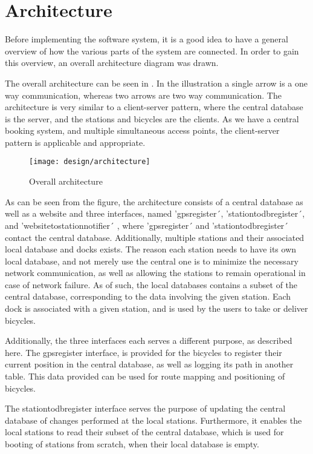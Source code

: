\section{Architecture}
Before implementing the software system, it is a good idea to have a general overview of how the various parts of the system are connected.
In order to gain this overview, an overall architecture diagram was drawn.

The overall architecture can be seen in .
In the illustration a single arrow is a one way communication, whereas two arrows are two way communication.
The architecture is very similar to a client-server pattern, where the central database is the server, and the stations and bicycles are the clients.
As we have a central booking system, and multiple simultaneous access points, the client-server pattern is applicable and appropriate.

\begin{figure}[h]
	\centering
	\texttt{[image: design/architecture]}
	\caption{Overall architecture}\label{fig:overallarch}
\end{figure}

As can be seen from the figure, the architecture consists of a central database as well as a website and three interfaces, named 'gpsregister´, 'stationtodbregister´, and 'websitetostationnotifier´ , where 'gpsregister´ and 'stationtodbregister´ contact the central database.
Additionally, multiple stations and their associated local database and docks exists.
The reason each station needs to have its own local database, and not merely use the central one is to minimize the necessary network communication, as well as allowing the stations to remain operational in case of network failure.
As of such, the local databases contains a subset of the central database, corresponding to the data involving the given station.
Each dock is associated with a given station, and is used by the users to take or deliver bicycles.

Additionally, the three interfaces each serves a different purpose, as described here.
The gpsregister interface, is provided for the bicycles to register their current position in the central database, as well as logging its path in another table.
This data provided can be used for route mapping and positioning of bicycles.

The stationtodbregister interface serves the purpose of updating the central database of changes performed at the local stations. Furthermore, it enables the local stations to read their subset of the central database, which is used for booting of stations from scratch, when their local database is empty.

